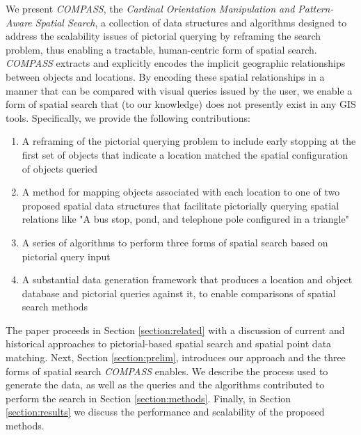 \par{We present \emph{COMPASS}, the \textit{Cardinal Orientation Manipulation and Pattern-Aware Spatial Search}, a collection of data structures and algorithms designed to address the scalability issues of pictorial querying by reframing the search problem, thus enabling a tractable, human-centric form of spatial search. 
\emph{COMPASS} extracts and explicitly encodes the implicit geographic relationships between objects and locations. 
By encoding these spatial relationships in a manner that can be compared with visual queries issued by the user, we enable a form of spatial search that (to our knowledge) does not presently exist in any GIS tools.
Specifically, we provide the following contributions:
\begin{enumerate}
    \item A reframing of the pictorial querying problem to include early stopping at the first set of objects that indicate a location matched the spatial configuration of objects queried
    \item A method for mapping objects associated with each location to one of two proposed spatial data structures that facilitate pictorially querying spatial relations like "A bus stop, pond, and telephone pole configured in a triangle"
    \item A series of algorithms to perform three forms of spatial search based on pictorial query input
    \item A substantial data generation framework that produces a location and object database and pictorial queries against it, to enable comparisons of spatial search methods
\end{enumerate}

The paper proceeds in Section \ref{section:related} with a discussion of current and historical approaches to pictorial-based spatial search and spatial point data matching. 
Next, Section \ref{section:prelim}, introduces our approach and the three forms of spatial search \emph{COMPASS} enables.
We describe the process used to generate the data, as well as the queries and the algorithms contributed to perform the search in Section \ref{section:methods}. 
Finally, in Section \ref{section:results} we discuss the performance and scalability of the proposed methods.
}


